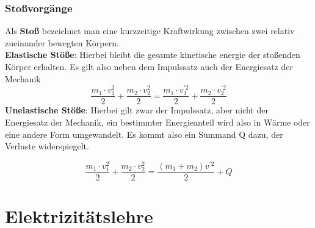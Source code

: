 \documentclass[12pt,a4paper,ngerman]{article}
\begin{document}
\subsubsection*{Stoßvorgänge}
Als \textbf{Stoß} bezeichnet man eine kurzzeitige Kraftwirkung zwischen zwei relativ zueinander bewegten Körpern. \\
\textbf{Elastische Stöße}: Hierbei bleibt die gesamte kinetische energie der stoßenden Körper erhalten. 
Es gilt also neben dem Impulssatz auch der Energiesatz der Mechanik 
\begin{equation}
\frac{m_1\cdot v_1^2}{2} + \frac{m_2 \cdot v_2^2}{2} = \frac{m_1 \cdot v_1^{\prime2}}{2} + \frac{m_2 \cdot v_2^{\prime2}}{2}
\end{equation}
\textbf{Unelastische Stöße}: Hierbei gilt zwar der Impulssatz, aber nicht der Energiesatz der Mechanik, ein bestimmter Energieanteil wird also in Wärme oder eine andere Form umgewandelt. Es kommt also ein Summand Q dazu, der Verluste widerspiegelt. 

\begin{equation}
\frac{m_1\cdot v_1^2}{2} + \frac{m_2 \cdot v_2^2}{2} = \frac{(m_1 + m_2)  v^{\prime2}}{2} + Q
\end{equation}

\pagebreak

\section{Elektrizitätslehre}
\end{document}
